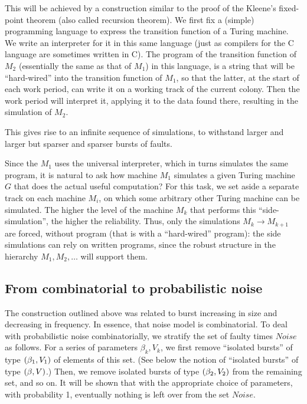 \documentclass[11pt]{memoir}
\theoremstyle{definition} %
\newcommand{\Noise}{\mathit{Noise}}
\begin{document}
This will be achieved by
a construction similar to the proof of the Kleene's fixed-point 
theorem (also called recursion theorem).
We first fix a (simple) programming language to express the transition
function of a Turing machine.
We write an interpreter for it in this same language (just as compilers for the 
C language are sometimes written in C).
The program of the transition function of \( M_{2} \)
(essentially the same as that of \( M_{1} \))
in this language, is a string that will be
``hard-wired'' into the transition function of \( M_{1} \), 
so that the latter, at the start of each work period, can write
it on a working track of the current colony.
Then the work period will interpret it, applying it to the data found there, resulting
in the simulation of \( M_{2} \).

This gives rise to an infinite sequence of simulations, to withstand
larger and larger but sparser and sparser bursts of faults.

Since the \( M_{1} \) uses the universal interpreter, which in turns
simulates the same program, it is natural to ask
how  machine \( M_{1} \) simulates a given Turing machine \( G \) that does the 
actual useful computation?
For this task, we set aside a separate track 
on each machine \( M_{i} \), on which some arbitrary other Turing machine can be
simulated.
The higher the level of the machine \( M_{k} \) that performs this
``side-simulation'', the higher the reliability.
Thus, only the simulations \( M_{k}\to M_{k+1} \) are forced, without program
(that is with a ``hard-wired'' program):
the side simulations can rely on written programs, since the robust
structure in the hierarchy \( M_{1},M_{2},\dots \) will support them.

\subsection{From combinatorial to probabilistic noise}

The construction outlined above was related to burst increasing in size and decreasing
in frequency.
In essence, that noise model is combinatorial.
To deal with probabilistic noise combinatorially,
we stratify the set of faulty times \( \Noise \) as follows.
For a series of parameters \( \beta_{k}, V_{k} \),
we first remove ``isolated bursts'' of type \( (\beta_{1},V_{1}) \) of elements of this set.
(See below the notion of ``isolated bursts'' of type \( (\beta,V) \).)
Then, we remove isolated bursts of type \( (\beta_{2},V_{2}) \) from the remaining set,
and so on.
It will be shown that with the appropriate choice of parameters, with probability 1,
eventually nothing is left over from the set \( \Noise \).
\end{document}
